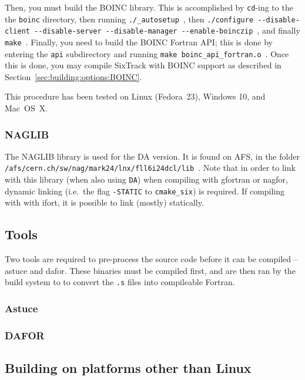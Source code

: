 \documentclass[english]{article}
\begin{document}
Then, you must build the BOINC library.
This is accomplished by \texttt{cd}-ing to the the \texttt{boinc} directory, then running \texttt{./\_autosetup}~, then \texttt{./configure -{}-disable-client -{}-disable-server -{}-disable-manager -{}-enable-boinczip}~, and finally \texttt{make}~.
Finally, you need to build the BOINC Fortran API; this is done by entering the \texttt{api} subdirectory and running \texttt{make boinc\_api\_fortran.o}~.
Once this is done, you may compile SixTrack with BOINC support as described in Section~\ref{sec:building:options:BOINC}.

This procedure has been tested on Linux (Fedora~23), Windows 10, and Mac~OS~X.

\subsubsection{NAGLIB}
\label{sec:building:libs:naglib}
The NAGLIB library  is used for the DA version.
It is found on AFS, in the folder \texttt{/afs/cern.ch/sw/nag/mark24/lnx/fll6i24dcl/lib}~.
Note that in order to link with this library (when also using \texttt{DA}) when compiling with gfortran or nagfor, dynamic linking (i.e.\ the flag \texttt{-STATIC} to \texttt{cmake\_six}) is required.
If compiling with with ifort, it is possible to link (mostly) statically.

\subsection{Tools}

Two tools are required to pre-process the source code before it can be compiled -- astuce and dafor.
These binaries must be compiled first, and are then ran by the build system to to convert the \texttt{.s} files into compileable Fortran.

\subsubsection{Astuce}

\subsubsection{DAFOR}

\subsection{Building on platforms other than Linux}
\end{document}
